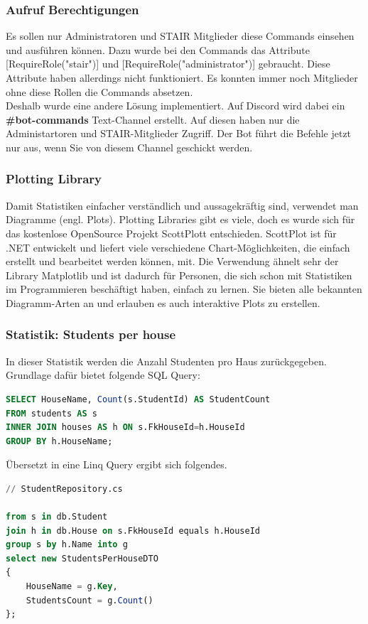 \documentclass[a4paper, table]{article}
\begin{document}
\subsubsection*{Aufruf Berechtigungen}
Es sollen nur Administratoren und STAIR Mitglieder diese Commands einsehen und ausführen können.
Dazu wurde bei den Commands das Attribute [RequireRole("stair")] und [RequireRole("administrator")] gebraucht.
Diese Attribute haben allerdings nicht funktioniert.
Es konnten immer noch Mitglieder ohne diese Rollen die Commands absetzen.\\
Deshalb wurde eine andere Lösung implementiert.
Auf Discord wird dabei ein \textbf{\#bot-commands} Text-Channel erstellt.
Auf diesen haben nur die Administartoren und STAIR-Mitglieder Zugriff.
Der Bot führt die Befehle jetzt nur aus, wenn Sie von diesem Channel geschickt werden.

\subsubsection*{Plotting Library}
Damit Statistiken einfacher verständlich und aussagekräftig sind, verwendet man Diagramme (engl. Plots).
Plotting Libraries gibt es viele, doch es wurde sich für das kostenlose OpenSource Projekt ScottPlott entschieden.
ScottPlot ist für .NET entwickelt und liefert viele verschiedene Chart-Möglichkeiten, die einfach erstellt und bearbeitet werden können, mit.
Die Verwendung ähnelt sehr der Library Matplotlib und ist dadurch für Personen, die sich schon mit Statistiken im Programmieren beschäftigt haben, einfach zu lernen.
Sie bieten alle bekannten Diagramm-Arten an und erlauben es auch interaktive Plots zu erstellen. \autocite{}

\newpage
\subsubsection*{Statistik: Students per house}
In dieser Statistik werden die Anzahl Studenten pro Haus zurückgegeben.
Grundlage dafür bietet folgende SQL Query:

\begin{lstlisting}[language=SQL]
SELECT HouseName, Count(s.StudentId) AS StudentCount
FROM students AS s
INNER JOIN houses AS h ON s.FkHouseId=h.HouseId
GROUP BY h.HouseName;
\end{lstlisting}

Übersetzt in eine Linq Query ergibt sich folgendes.

\begin{lstlisting}[language=SQL]
// StudentRepository.cs

from s in db.Student
join h in db.House on s.FkHouseId equals h.HouseId
group s by h.Name into g
select new StudentsPerHouseDTO
{
    HouseName = g.Key,
    StudentsCount = g.Count()
};
\end{lstlisting}
\end{document}
